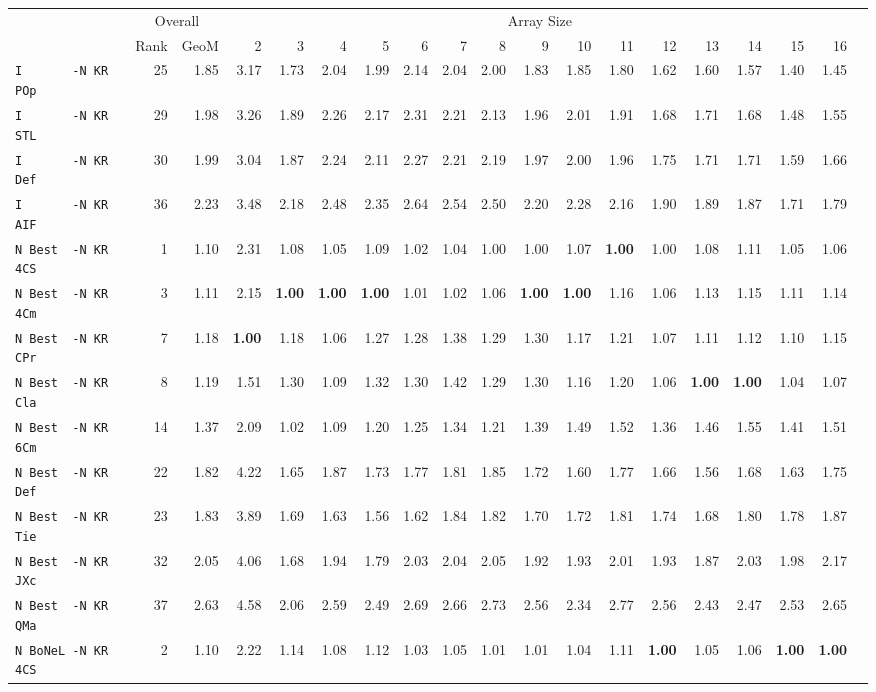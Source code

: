 \begin{tabular}{l | r @{~~} r | r@{~~}r@{~~}r@{~~}r@{~~}r@{~~}r@{~~}r@{~~}r@{~~}r@{~~}r@{~~}r@{~~}r@{~~}r@{~~}r@{~~}r@{~~}r|}
 & \multicolumn{2}{c}{Overall} & \multicolumn{15}{c}{Array Size} \\
 & Rank & GeoM & 2&3&4&5&6&7&8&9&10&11&12&13&14&15&16\\ \hline
\verb+I       -N KR POp+ & 25 & 1.85 & 3.17&1.73&2.04&1.99&2.14&2.04&2.00&1.83&1.85&1.80&1.62&1.60&1.57&1.40&1.45\\
\verb+I       -N KR STL+ & 29 & 1.98 & 3.26&1.89&2.26&2.17&2.31&2.21&2.13&1.96&2.01&1.91&1.68&1.71&1.68&1.48&1.55\\
\verb+I       -N KR Def+ & 30 & 1.99 & 3.04&1.87&2.24&2.11&2.27&2.21&2.19&1.97&2.00&1.96&1.75&1.71&1.71&1.59&1.66\\
\verb+I       -N KR AIF+ & 36 & 2.23 & 3.48&2.18&2.48&2.35&2.64&2.54&2.50&2.20&2.28&2.16&1.90&1.89&1.87&1.71&1.79\smallskip \\
\verb+N Best  -N KR 4CS+ & 1 & 1.10 & 2.31&1.08&1.05&1.09&1.02&1.04&1.00&1.00&1.07&\textbf{1.00}&1.00&1.08&1.11&1.05&1.06\\
\verb+N Best  -N KR 4Cm+ & 3 & 1.11 & 2.15&\textbf{1.00}&\textbf{1.00}&\textbf{1.00}&1.01&1.02&1.06&\textbf{1.00}&\textbf{1.00}&1.16&1.06&1.13&1.15&1.11&1.14\\
\verb+N Best  -N KR CPr+ & 7 & 1.18 & \textbf{1.00}&1.18&1.06&1.27&1.28&1.38&1.29&1.30&1.17&1.21&1.07&1.11&1.12&1.10&1.15\\
\verb+N Best  -N KR Cla+ & 8 & 1.19 & 1.51&1.30&1.09&1.32&1.30&1.42&1.29&1.30&1.16&1.20&1.06&\textbf{1.00}&\textbf{1.00}&1.04&1.07\\
\verb+N Best  -N KR 6Cm+ & 14 & 1.37 & 2.09&1.02&1.09&1.20&1.25&1.34&1.21&1.39&1.49&1.52&1.36&1.46&1.55&1.41&1.51\\
\verb+N Best  -N KR Def+ & 22 & 1.82 & 4.22&1.65&1.87&1.73&1.77&1.81&1.85&1.72&1.60&1.77&1.66&1.56&1.68&1.63&1.75\\
\verb+N Best  -N KR Tie+ & 23 & 1.83 & 3.89&1.69&1.63&1.56&1.62&1.84&1.82&1.70&1.72&1.81&1.74&1.68&1.80&1.78&1.87\\
\verb+N Best  -N KR JXc+ & 32 & 2.05 & 4.06&1.68&1.94&1.79&2.03&2.04&2.05&1.92&1.93&2.01&1.93&1.87&2.03&1.98&2.17\\
\verb+N Best  -N KR QMa+ & 37 & 2.63 & 4.58&2.06&2.59&2.49&2.69&2.66&2.73&2.56&2.34&2.77&2.56&2.43&2.47&2.53&2.65\smallskip \\
\verb+N BoNeL -N KR 4CS+ & 2 & 1.10 & 2.22&1.14&1.08&1.12&1.03&1.05&1.01&1.01&1.04&1.11&\textbf{1.00}&1.05&1.06&\textbf{1.00}&\textbf{1.00}\\

\end{tabular}
